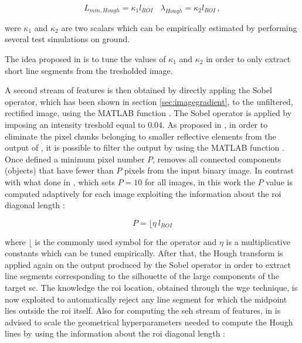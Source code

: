 \begin{equation*}
L_{min,Hough} = \kappa_1 l_{ROI} \ \ \ \  \lambda_{Hough} = \kappa_2 l_{ROI}  \,,
\end{equation*}

were $\kappa_1$ and $\kappa_2$ are two scalars which can be empirically estimated by performing several test simulations on ground. 

The idea proposed in \cite{Sharma2018} is to tune the values of $\kappa_1$ and $\kappa_2$ in order to only extract short line segments from the tresholded image.

A second stream of features is then obtained by directly appling the Sobel operator, which has been shown in section \ref{sec:imagegradient}, to the unfiltered, rectified image, using the MATLAB function . The Sobel operator is applied by imposing an intensity treshold equal to $0.04$. As proposed in \cite{fracchio2019}, in order to eliminate the pixel chunks belonging to smaller reflective elements from the output of , it is possible to filter the output by using the MATLAB function . Once defined a minimum pixel number $P$,  removes all connected components (objects) that have fewer than $P$ pixels from the input binary image. In contrast with what done in \cite{fracchio2019}, which sets $P = 10$ for all images, in this work the $P$ value is computed adaptively for each image exploiting the information about the \acrshort{roi} diagonal length :

\begin{equation*}
P = \lfloor \eta \ l_{ROI}
\end{equation*}

where $\lfloor$ is the commonly used symbol for the  operator and $\eta$ is a multiplicative constants which can be tuned empirically.
After that, the Hough transform is applied again on the output produced by the Sobel operator in order to extract line segments corresponding to the silhouette of the large components of the target \acrshort{sc}. The knowledge the \acrshort{roi} location, obtained through the \acrshort{wge} technique, is now exploited to automatically reject any line segment for which the midpoint lies outside the \acrshort{roi} itself. Also for computing the \acrfull{seh} stream of features, in \cite{Sharma2018} is advised to scale the geometrical hyperparameters needed to compute the Hough lines by using the information about the \acrshort{roi} diagonal length :

